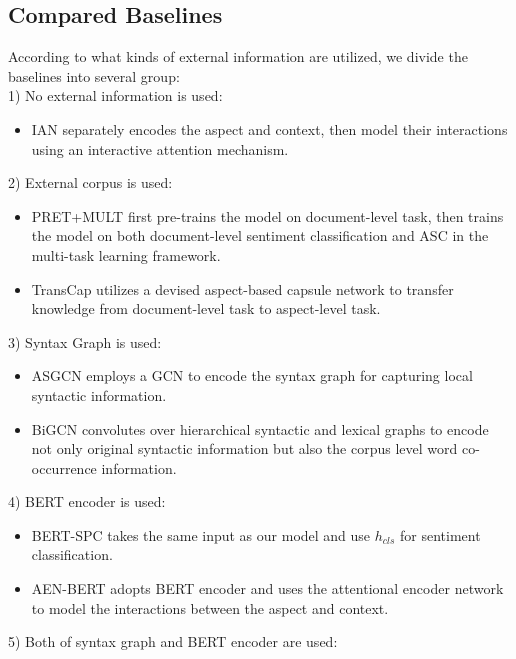 \subsection{Compared Baselines}
According to what kinds of external information are utilized, we divide the baselines into several group:\\
1) No external information is used:
 \begin{itemize}
 \item IAN \cite{IAN} separately encodes the aspect and context, then model their interactions using an interactive attention mechanism.
\end{itemize}
2) External corpus is used:
 \begin{itemize}
 \item  PRET+MULT \cite{hrd} first pre-trains the model on document-level task, then trains the model on both document-level sentiment classification and ASC in the multi-task learning framework.
 \item TransCap \cite{transcap} utilizes a devised aspect-based capsule network to transfer knowledge from document-level task to aspect-level task.
\end{itemize}
3) Syntax Graph is used: 
 \begin{itemize}
 \item ASGCN \cite{asgcn} employs a GCN to encode the syntax graph for capturing local syntactic information.
 \item BiGCN \cite{bigcn} convolutes over hierarchical syntactic and lexical graphs to encode not only original syntactic information but also the corpus level word co-occurrence information.
\end{itemize}
4) BERT encoder is used: 
 \begin{itemize}
 \item BERT-SPC \cite{bert} takes the same input as our model and use $h_{cls}$ for sentiment classification.
 \item AEN-BERT \cite{aen-bert} adopts BERT encoder and uses the attentional encoder network to model the interactions between the aspect and context.
\end{itemize}
5) Both of syntax graph and BERT encoder are used: 
